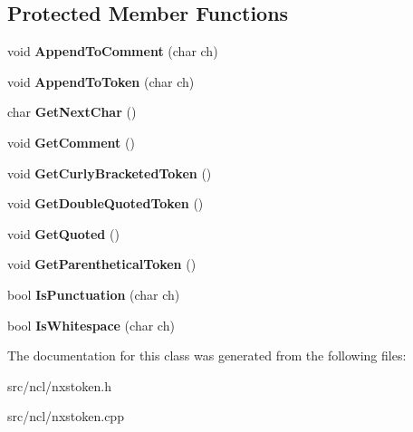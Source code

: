 \subsection*{Protected Member Functions}
\begin{DoxyCompactItemize}
\item 
\hypertarget{classNxsToken_aa142a5a69e1c72baf998e368f727ffee}{
void {\bfseries AppendToComment} (char ch)}
\label{classNxsToken_aa142a5a69e1c72baf998e368f727ffee}

\item 
\hypertarget{classNxsToken_afb74dbfb0fa6a930fd33ef59e235f710}{
void {\bfseries AppendToToken} (char ch)}
\label{classNxsToken_afb74dbfb0fa6a930fd33ef59e235f710}

\item 
\hypertarget{classNxsToken_a4f192c1a77663b4de509e0838929d312}{
char {\bfseries GetNextChar} ()}
\label{classNxsToken_a4f192c1a77663b4de509e0838929d312}

\item 
\hypertarget{classNxsToken_aad4d827a0814f56659327415508c9d79}{
void {\bfseries GetComment} ()}
\label{classNxsToken_aad4d827a0814f56659327415508c9d79}

\item 
\hypertarget{classNxsToken_a795e4e69cf60a1d2d61db352f79aedd2}{
void {\bfseries GetCurlyBracketedToken} ()}
\label{classNxsToken_a795e4e69cf60a1d2d61db352f79aedd2}

\item 
\hypertarget{classNxsToken_a574341a2ecd844630d340a28e64ff413}{
void {\bfseries GetDoubleQuotedToken} ()}
\label{classNxsToken_a574341a2ecd844630d340a28e64ff413}

\item 
\hypertarget{classNxsToken_a76bc1b62bee1e6de6a9ab2e01d720517}{
void {\bfseries GetQuoted} ()}
\label{classNxsToken_a76bc1b62bee1e6de6a9ab2e01d720517}

\item 
\hypertarget{classNxsToken_ad73bcb3d0feecbbf86d2b3b017667047}{
void {\bfseries GetParentheticalToken} ()}
\label{classNxsToken_ad73bcb3d0feecbbf86d2b3b017667047}

\item 
\hypertarget{classNxsToken_ace5934a87892ba50ebea2c1b93866dc3}{
bool {\bfseries IsPunctuation} (char ch)}
\label{classNxsToken_ace5934a87892ba50ebea2c1b93866dc3}

\item 
\hypertarget{classNxsToken_a4362f9387840f57ebde0f7aa5bf6d4c8}{
bool {\bfseries IsWhitespace} (char ch)}
\label{classNxsToken_a4362f9387840f57ebde0f7aa5bf6d4c8}

\end{DoxyCompactItemize}


The documentation for this class was generated from the following files:\begin{DoxyCompactItemize}
\item 
src/ncl/nxstoken.h\item 
src/ncl/nxstoken.cpp\end{DoxyCompactItemize}
